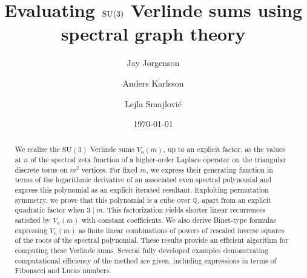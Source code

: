 \documentclass[11pt,reqno]{amsart}
\title[Verlinde sums, graph theory and Binet formulas]{Evaluating $\text{\rm SU}(3)$ Verlinde sums using spectral graph theory}
\author{Jay Jorgenson}\thanks{The first named author acknowledges grant support from PSC-CUNY Awards 67415-00 55 and 68462-00 56, which are jointly funded by the Professional Staff Congress and The City University of New York.}
\author{Anders Karlsson}\thanks{The second-named author was supported by the Swiss NSF Grants 200020-200400 and 200021-212864, and by the Swedish Research Council Grant 104651320.}
\author{Lejla Smajlovi\'c}
\date{\today}
\theoremstyle{remark}
\begin{document}
\begin{abstract}
We realize the $\mathrm{SU}(3)$ Verlinde sums $V_n(m)$, up to an
explicit factor, as the values at $n$ of the spectral zeta function
of a higher-order Laplace operator on the
triangular discrete torus on $m^2$ vertices. %
For fixed $m$, we express their generating function in terms of the
logarithmic derivative of an associated even spectral polynomial
and express this polynomial as an explicit iterated resultant.
Exploiting permutation symmetry, we prove that this polynomial is
a cube over $\mathbb{Q}$, apart from an explicit quadratic factor
when $3\mid m$.
This factorization yields shorter linear recurrences satisfied by $V_n(m)$ with constant
coefficients.
We also derive Binet-type formulas expressing $V_n(m)$ as finite
linear combinations of powers of rescaled inverse squares of the
roots of the spectral polynomial.
These results provide an efficient algorithm for computing
these Verlinde sums.
Several fully developed examples demonstrating computational efficiency of the method are given, including expressions in terms of Fibonacci and Lucas numbers.
\end{abstract}

\maketitle
\end{document}
